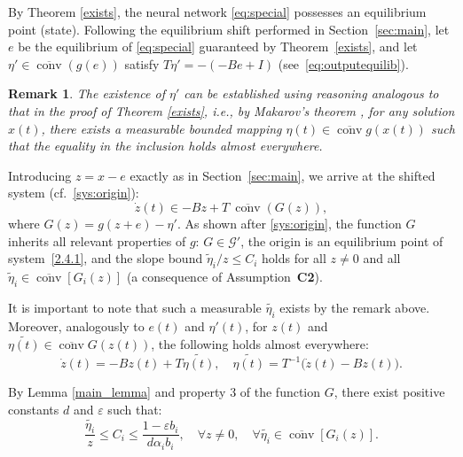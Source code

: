 \documentclass[journal]{IEEEtran}
\theoremstyle{myplain}
\newtheorem{remark}{Remark}
\begin{document}
\begin{IEEEproof} 
By Theorem \ref{exists}, the neural network \eqref{eq:special} possesses an equilibrium point (state).
Following the equilibrium shift performed in Section~\ref{sec:main}, let $e$ be the equilibrium of \eqref{eq:special} guaranteed by Theorem~\ref{exists}, and let $\eta' \in \overline{\operatorname{conv}}(g(e))$ satisfy $T\eta' = -(-Be + I)$ (see~\eqref{eq:outputequilib}).

\begin{remark}
{The existence of $\eta'$ can be established using reasoning analogous to that in the proof of Theorem \ref{exists}, i.e., by Makarov's theorem \cite{YLG}, for any solution $x(t)$, there exists a measurable bounded mapping $\eta(t) \in \overline{\operatorname{conv}}g(x(t))$ such that the equality in the inclusion holds almost everywhere.}
\end{remark}

Introducing $z = x - e$ exactly as in Section~\ref{sec:main}, we arrive at the shifted system (cf.~\eqref{sys:origin}):
\begin{equation}\label{2.4.1}
\dot z(t) \in -Bz+T~ \overline{\operatorname{conv}}(G(z)),
\end{equation}
where $G(z)=g(z+e)-\eta'$. As shown after \eqref{sys:origin}, the function $G$ inherits all relevant properties of $g$: $G \in \mathcal{G}'$, the origin is an equilibrium point of system~\eqref{2.4.1}, and the slope bound $\widetilde{\eta}_i / z \leqslant C_i$ holds for all $z \ne 0$ and all $\widetilde{\eta}_i \in \overline{\operatorname{conv}}[G_i(z)]$ (a consequence of Assumption~\textbf{C2}).

    It is important to note that such a measurable $\widetilde{\eta_i}$ exists by the remark above. Moreover, analogously to $e(t)$ and $\eta'(t)$, for $z(t)$ and $\widetilde{\eta(t)} \in \overline{\operatorname{conv}}G(z(t))$, the following holds almost everywhere:
\begin{equation}\label{2.4.2}
\dot z (t) = -Bz(t) + T \widetilde{\eta(t)}, \quad \widetilde{\eta(t)} = T ^{-1}\big(\dot z(t) - Bz(t)\big).     
\end{equation}

By Lemma \ref{main_lemma} and property 3 of the function $G$, there exist positive constants $d$ and $\varepsilon$ such that:
\begin{equation}\label{2.4.3}
\frac{\widetilde{\eta_i}}{z} \leqslant C_i \leqslant \frac{1 - \varepsilon b_i}{d \alpha_i b_i},\quad \forall z \ne 0,\quad \forall \widetilde{\eta_i} \in  \overline{\operatorname{conv}}[G_i(z)].    
\end{equation}



\end{IEEEproof}
\end{document}
